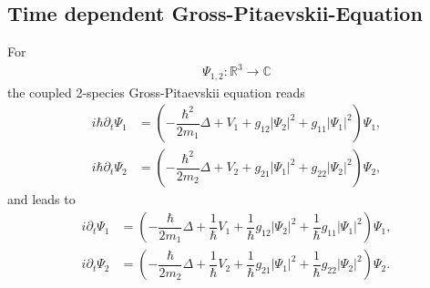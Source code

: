\documentclass[12pt]{article}
\begin{document}
\subsection{Time dependent Gross-Pitaevskii-Equation}
For 
\begin{align}
\Psi_{1,2} : \mathbb{R}^3 \rightarrow \mathbb{C} \nonumber
\end{align}
the coupled 2-species Gross-Pitaevskii equation reads
\begin{align}
i \hbar \partial_t \Psi_1 &= \left( -\dfrac{\hbar^2}{2m_1} \Delta + V_1 + g_{12} \vert\Psi_2\vert^2 + g_{11} \vert\Psi_1\vert^2\right)\Psi_1 ,\nonumber\\
i \hbar \partial_t \Psi_2 &= \left( -\dfrac{\hbar^2}{2m_2} \Delta + V_2 + g_{21} \vert\Psi_1\vert^2 + g_{22} \vert\Psi_2\vert^2\right)\Psi_2 \nonumber,
\end{align}
and leads to
\begin{align}
i\partial_t \Psi_1 &= \left(- \dfrac{\hbar}{2m_1} \Delta +\dfrac{1}{\hbar} V_1 + \dfrac{1}{\hbar} g_{12} \vert\Psi_2\vert^2 + \dfrac{1}{\hbar} g_{11} \vert\Psi_1\vert^2\right)\Psi_1 \label{tdnlse01},\\
i\partial_t \Psi_2 &= \left(- \dfrac{\hbar}{2m_2} \Delta + \dfrac{1}{\hbar} V_2 + \dfrac{1}{\hbar} g_{21} \vert\Psi_1\vert^2 + \dfrac{1}{\hbar} g_{22} \vert\Psi_2\vert^2\right)\Psi_2 \label{tdnlse02}.
\end{align}
\end{document}
